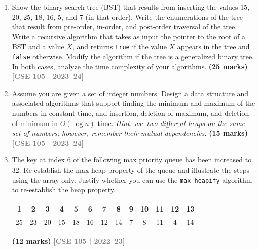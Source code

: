 \documentclass[12pt,a3paper]{article}
\newcommand{\yr}[1]{\hfill\textcolor{gray}{\small\textbf{[#1]}}}
\newcommand{\mk}[1]{\textcolor{orange!70!black}{\small\textbf{(#1 marks)}}}
\begin{document}
\begin{enumerate}
\item Show the binary search tree (BST) that results from inserting the values 15, 20, 25, 18, 16, 5, and 7 (in that order). Write the enumerations of the tree that result from pre-order, in-order, and post-order traversal of the tree. Write a recursive algorithm that takes as input the pointer to the root of a BST and a value $X$, and returns \texttt{true} if the value $X$ appears in the tree and \texttt{false} otherwise. Modify the algorithm if the tree is a generalized binary tree. In both cases, analyze the time complexity of your algorithms. \mk{25}
\yr{CSE 105 | 2023--24}


\item Assume you are given a set of integer numbers. Design a data structure and associated algorithms that support finding the minimum and maximum of the numbers in constant time, and insertion, deletion of maximum, and deletion of minimum in $O(\log n)$ time. \textit{Hint: use two different heaps on the same set of numbers; however, remember their mutual dependencies.} \mk{15}
\yr{CSE 105 | 2023--24}


\item The key at index 6 of the following max priority queue has been increased to 32. Re-establish the max-heap property of the queue and illustrate the steps using the array only. Justify whether you can use the \texttt{max\_heapify} algorithm to re-establish the heap property.
\begin{center}
\begin{tabular}{c|c|c|c|c|c|c|c|c|c|c|c|c}
\toprule
1 & 2 & 3 & 4 & 5 & 6 & 7 & 8 & 9 & 10 & 11 & 12 & 13 \\
\midrule
25 & 23 & 20 & 15 & 18 & 16 & 12 & 14 & 7 & 8 & 11 & 4 & 14 \\
\bottomrule
\end{tabular}
\end{center}
\mk{12}
\yr{CSE 105 | 2022--23}



\end{enumerate}
\end{document}
